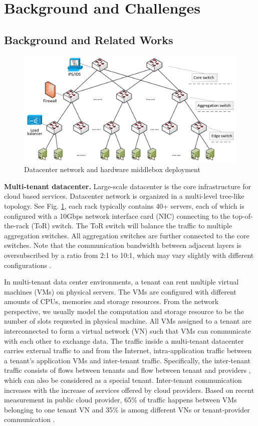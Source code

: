 \documentclass[review]{elsarticle}
\begin{document}
\section{Background and Challenges}\label{sec:background}
\subsection{Background and Related Works}


\begin{figure}
	\centering
	\includegraphics[width=4.5in]{fig/topology.pdf}
	\caption{Datacenter network and hardware middlebox deployment}
	\label{fig:topo}
\end{figure}

\textbf{Multi-tenant datacenter. }
Large-scale datacenter is the core infrastructure for cloud based services. Datacenter network is organized in a multi-level tree-like topology. See Fig. \ref{fig:topo}, each rack typically contains 40+ servers, each of which is configured with a 10Gbps network interface card (NIC) connecting to the top-of-the-rack (ToR) switch. The ToR switch will balance the traffic to multiple aggregation switches. All aggregation switches are further connected to the core switches. Note that the communication bandwidth between adjacent layers is oversubscribed by a ratio from 2:1 to 10:1, which may vary slightly with different configurations \cite{B13cta, williamson2010has}.

In multi-tenant data center environments, a tenant can rent multiple virtual machines (VMs) on physical servers. The VMs are configured with different amounts of CPUs, memories and storage resources. From the network perspective, we usually model the computation and storage resource to be the number of slots requested in physical machine. All VMs assigned to a tenant are interconnected to form a virtual network (VN) such that VMs can communicate with each other to exchange data. The traffic inside a multi-tenant datacenter carries external traffic to and from the Internet, intra-application traffic between a tenant's application VMs and inter-tenant traffic. Specifically, the inter-tenant traffic consists of flows between tenants and flow between tenant and providers \cite{B13cta}, which can also be considered as a special tenant. Inter-tenant communication increases with the increase of services offered by cloud providers. Based on recent measurement in public cloud provider, 65\% of traffic happens between VMs belonging to one tenant VN and 35\% is among different VNs or tenant-provider communication \cite{B13cta, P13acs}.
\end{document}
